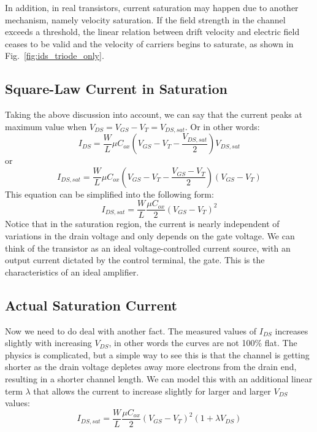 In addition, in real transistors, current saturation may happen due to another mechanism, namely velocity saturation. If the field strength in the channel exceeds a threshold, the linear relation between drift velocity and electric field ceases to be valid and the velocity of carriers begins to saturate, as shown in Fig.~\ref{fig:ids_triode_only}.


\subsection{Square-Law Current in Saturation}

Taking the above discussion into account, we can say that the current peaks at maximum value when 
$V_{DS} = V_{GS} - V_{T} = V_{DS,sat}$.  Or in other words:
%
\begin{equation}
	I_{DS} = \frac{W}{L}\mu {C_{ox}}({V_{GS}} - {V_T} - \frac{{{V_{DS,sat}}}}{2}){V_{DS,sat}}
\end{equation}
%
or 
%
\begin{equation}
	{I_{DS,sat}} = \frac{W}{L}\mu {C_{ox}}({V_{GS}} - {V_T} - \frac{{{V_{GS}} - {V_T}}}{2})({V_{GS}} - {V_T})
\end{equation}
%
This equation can be simplified into the following form:
%
\begin{equation}
	{I_{DS,sat}} = \frac{W}{L}\frac{{\mu {C_{ox}}}}{2}{({V_{GS}} - {V_T})^2}
\end{equation}
% 
Notice that in the saturation region, the current is nearly independent of variations in the drain voltage and only depends on the gate voltage.  We can think of the transistor as an ideal voltage-controlled current source, with an output current dictated by the control terminal, the gate.  This is the characteristics of an ideal amplifier.



\subsection{Actual Saturation Current}

Now we need to do deal with another fact.  The measured values of  $I_{DS}$ increases slightly with increasing $V_{DS}$, in other words the curves are not 100\% flat.   The physics is complicated, but a simple way to see this is that the channel is getting shorter as the drain voltage depletes away more electrons from the drain end, resulting in a shorter channel length.   We can model this with an additional linear term $\lambda$ that allows the current to increase slightly for larger and larger $V_{DS}$ values:
% 
\begin{equation}
	{I_{DS,sat}} = \frac{W}{L}\frac{{\mu {C_{ox}}}}{2}{({V_{GS}} - {V_T})^2}(1 + \lambda {V_{DS}})
\end{equation}



